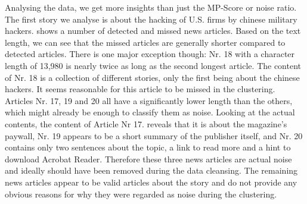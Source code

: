 Analysing the data, we get more insights than just the MP-Score or noise ratio.
The first story we analyse is about the hacking of U.S. firms by chinese military hackers.
 shows a number of detected and missed news articles.
Based on the text length, we can see that the missed articles are generally shorter
compared to detected articles.
There is one major exception though:
Nr. 18 with a character length of 13,980 is nearly twice as long as the second longest article.
The content of Nr. 18 is a collection of different stories, only the first being about the chinese hackers.
It seems reasonable for this article to be missed in the clustering.
Articles Nr. 17, 19 and 20 all have a significantly lower length than the others,
which might already be enough to classify them as noise.
Looking at the actual contents, the content of Article Nr 17. reveals that it is about the magazine's paywall,
Nr. 19 appears to be a short summary of the publisher itself, and Nr. 20 contains only two sentences about the topic,
a link to read more and a hint to download Acrobat Reader.
Therefore these three news articles are actual noise and ideally should have been removed during the data cleansing.
The remaining news articles appear to be valid articles about the story
and do not provide any obvious reasons for why they were regarded as noise during the clustering.

